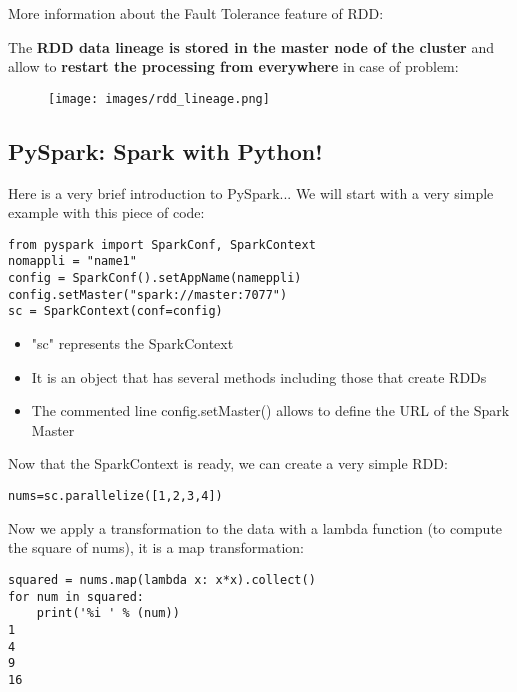 \documentclass{beamer}[10pt, usepdftitle=false handout]
\begin{document}
\begin{frame}

More information about the Fault Tolerance feature of RDD:
\vspace*{0.6em}

The \textbf{RDD data lineage is stored in the master node of the cluster} and allow to \textbf{restart the processing from everywhere} in case of problem:
\vspace*{0.6em}

\begin{figure}
	\texttt{[image: images/rdd\_lineage.png]} 
\end{figure}

\end{frame}

\subsection{PySpark: Spark with Python!}
\begin{frame}[fragile]

Here is a very brief introduction to PySpark... We will start with a very simple example with this piece of code:
\vspace*{0.6em}

\begin{verbatim}
from pyspark import SparkConf, SparkContext
nomappli = "name1"
config = SparkConf().setAppName(nameppli)
config.setMaster("spark://master:7077")
sc = SparkContext(conf=config)
\end{verbatim}

\begin{itemize}
\item{"sc" represents the SparkContext}
\item{It is an object that has several methods including those that create RDDs}
\item{The commented line config.setMaster() allows to define the URL of the Spark Master}
\end{itemize}

\end{frame}
\begin{frame}[fragile]
Now that the SparkContext is ready, we can create a very simple RDD:
\vspace*{0.6em}

\begin{verbatim}
nums=sc.parallelize([1,2,3,4]) 
\end{verbatim} 

Now we apply a transformation to the data with a lambda function (to compute the square of nums), it is a map transformation:
\vspace*{0.6em}

\begin{verbatim}
squared = nums.map(lambda x: x*x).collect()
for num in squared:
    print('%i ' % (num))
1 
4 
9 
16 
\end{verbatim}
\end{frame}
\end{document}

